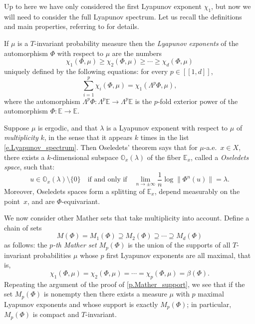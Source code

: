 \documentclass[10pt]{amsart}
\newcommand{\ldbrack}{[\![}
\newcommand{\rdbrack}{]\!]}
\theoremstyle{plain}
\theoremstyle{definition}
\newcommand{\EE}{\mathbb{E}}
\newcommand{\WEDGE}{\mathsf{\Lambda}}
\begin{document}
Up to here we have only considered the first Lyapunov exponent $\chi_1$, but now we will need to consider the full Lyapunov spectrum. Let us recall the definitions and main properties, referring to \cite{Arnold} for details.

If $\mu$ is a $T$-invariant probability measure then the \emph{Lyapunov exponents} of the automorphism $\Phi$ with respect to $\mu$ are the numbers
\begin{equation}\label{e.Lyapunov_spectrum}
\chi_1(\Phi,\mu) \ge \chi_2(\Phi,\mu) \ge \cdots \ge \chi_d(\Phi,\mu)
\end{equation}
uniquely defined by the following equations: for every $p \in \ldbrack 1,d \rdbrack$,
\begin{equation}\label{e.Lyapunov_wedge}
\sum_{i=1}^p \chi_i(\Phi,\mu) =
\chi_1(\WEDGE^p \Phi, \mu),
\end{equation}
where the automorphism $\WEDGE^p \Phi \colon \WEDGE^p \EE \to \WEDGE^p \EE$ is the $p$-fold exterior power of the automorphism ${\Phi \colon \EE \to \EE}$.

Suppose $\mu$ is ergodic, and that $\lambda$ is a Lyapunov exponent with respect to $\mu$ of \emph{multiplicity} $k$, in the sense that it appears $k$ times in the list \eqref{e.Lyapunov_spectrum}.
Then Oseledets' theorem says that for $\mu$-a.e.\ $x\in X$, there exists a $k$-dimensional subspace $\mathbb{O}_x(\lambda)$ of the fiber $\EE_x$, called a \emph{Oseledets space}, such that:
\[
u \in \mathbb{O}_x(\lambda) \setminus \{0\} \quad \text{if and only if} \quad
\lim_{n \to \pm \infty} \frac{1}{n} \log \|\Phi^n(u)\| = \lambda.
\]
Moreover, Oseledets spaces form a splitting of $\EE_x$, depend measurably on the point~$x$, and are $\Phi$-equivariant.

We now consider other Mather sets that take multiplicity into account.
Define a chain of sets
\begin{equation}\label{e.chain_Mathers}
M(\Phi) = M_1(\Phi) \supseteq M_2(\Phi) \supseteq \cdots \supseteq M_d(\Phi)
\end{equation}
as follows: the \emph{$p$-th Mather set} $M_p(\Phi)$ is the union of the supports of all $T$-invariant probabilities $ \mu $ whose $p$ first Lyapunov exponents are all maximal, that is,
\[
\chi_1(\Phi,\mu) = \chi_2(\Phi,\mu) = \cdots = \chi_p(\Phi,\mu) = \beta(\Phi).
\]
Repeating the argument of the proof of \cref{p.Mather_support}, we see that if the set $M_p(\Phi)$ is nonempty then there exists a measure $\mu$ with $p$ maximal Lyapunov exponents and whose support is exactly $M_p(\Phi)$; in particular, $M_p(\Phi)$ is compact and $T$-invariant.
\end{document}
